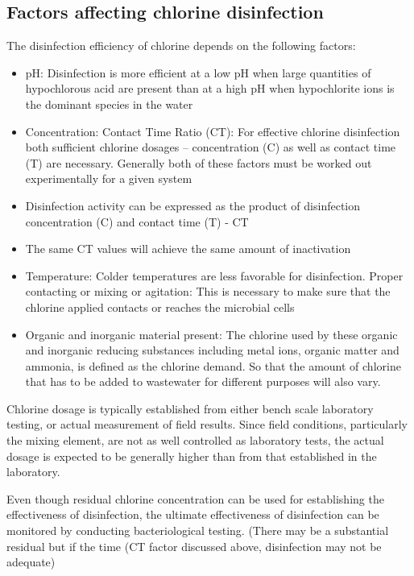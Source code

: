 \subsection{Factors affecting chlorine disinfection}
The disinfection efficiency of chlorine depends on the following factors:\\
\begin{itemize}
	\item pH:  Disinfection is more efficient at a low pH when large quantities of hypochlorous acid are present than at a high pH when hypochlorite ions is the dominant species in the water
	\item Concentration:  Contact Time Ratio (CT):  For effective chlorine disinfection both sufficient chlorine dosages – concentration (C) as well as contact time (T) are necessary.   Generally both of these factors must be worked out experimentally for a given system
	\item Disinfection activity can be expressed as the product of disinfection concentration (C) and contact time (T) - CT
	\item The same CT values will achieve the same amount of inactivation
	\item Temperature:  Colder temperatures are less favorable for disinfection. 
Proper contacting or mixing or agitation:  This is necessary to make sure that the chlorine applied contacts or reaches the microbial cells
	\item Organic and inorganic material present:  The chlorine used by these organic and inorganic reducing substances including metal ions, organic matter and ammonia, is defined as the chlorine demand.  So that the amount of chlorine that has to be added to wastewater for different purposes will also vary.  \\
\end{itemize}
Chlorine dosage is typically established from either bench scale laboratory testing, or actual measurement of field results. Since field conditions, particularly the mixing element, are not as well controlled as laboratory tests, the actual dosage is expected to be generally higher than from that established in the laboratory. 

Even though residual chlorine concentration can be used for establishing the effectiveness of disinfection, the ultimate effectiveness of disinfection can be monitored by conducting bacteriological testing. (There may be a substantial residual but if the time (CT factor discussed above, disinfection may not be adequate)\\

